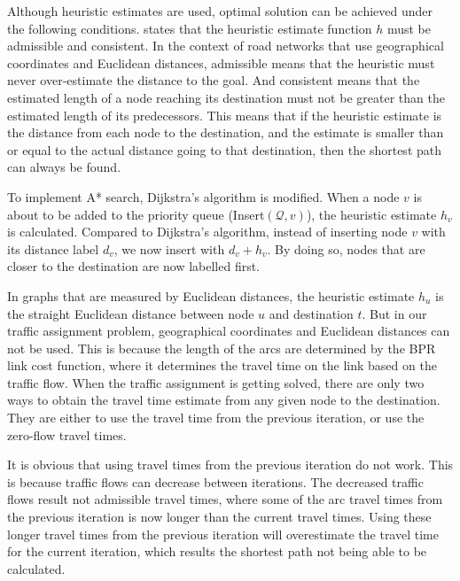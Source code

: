 Although heuristic estimates are used,
optimal solution can be achieved under the following conditions.
\citet{Astar} states that the heuristic estimate function $h$ must be admissible and consistent.
In the context of road networks that use geographical coordinates and Euclidean distances,
admissible means that the heuristic must never over-estimate the distance to the goal.
And consistent means that the estimated length of a node reaching its destination must not be greater than the estimated length of its predecessors.
This means that if the heuristic estimate is the distance from each node to the destination,
and the estimate is smaller than or equal to the actual distance going to that destination,
then the shortest path can always be found. 


To implement A* search,
Dijkstra's algorithm is modified.
When a node $v$ is about to be added to the priority queue (Insert$(\mathcal{Q},v)$),
the heuristic estimate $h_v$ is calculated.
Compared to Dijkstra's algorithm,
instead of inserting node $v$ with its distance label $d_v$,
we now insert with $d_v + h_v$.
By doing so,
nodes that are closer to the destination are now labelled first.

In graphs that are measured by Euclidean distances,
the heuristic estimate $h_u$ is the straight Euclidean distance between node $u$ and destination $t$.
But in our traffic assignment problem,
geographical coordinates and Euclidean distances can not be used.
This is because the length of the arcs are determined by the BPR link cost function,
where it determines the travel time on the link based on the traffic flow.
When the traffic assignment is getting solved,
there are only two ways to obtain the travel time estimate from any given node to the destination.
They are either to use the travel time from the previous iteration,
or use the zero-flow travel times.

It is obvious that using travel times from the previous iteration do not work.
This is because traffic flows can decrease between iterations.
The decreased traffic flows result not admissible travel times,
where some of the arc travel times from the previous iteration is now longer than the current travel times.
Using these longer travel times from the previous iteration will overestimate the travel time for the current iteration,
which results the shortest path not being able to be calculated.

